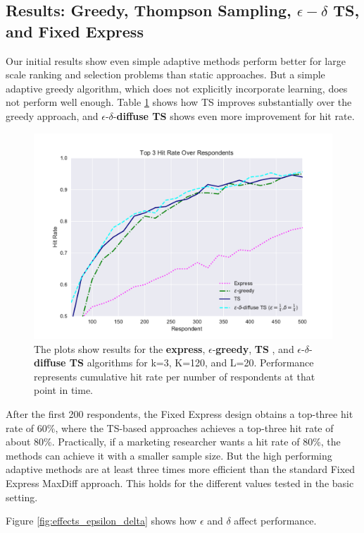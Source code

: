 \documentclass[a4paper,11pt]{article}
\newcommand{\fixedexpress}{\textbf{express}}
\newcommand{\egreedy}{$\epsilon$-\textbf{greedy}}
\newcommand{\ts}{\textbf{TS} }
\newcommand{\edts}{$\epsilon$-$\delta$-\textbf{diffuse TS} }
\begin{document}
\subsection{Results: Greedy, Thompson Sampling, $\epsilon-\delta$ TS, and Fixed Express}

Our initial results show even simple adaptive methods perform better for large scale ranking and selection problems than static approaches. But a simple adaptive greedy algorithm, which does not explicitly incorporate learning, does not perform well enough. Table \ref{fig:simple_result} shows how TS improves substantially over the greedy approach, and \edts shows even more improvement for hit rate.

\begin{figure}
\caption{The plots show results for the \fixedexpress, \egreedy, \ts, and \edts algorithms for k=3, K=120, and L=20. Performance represents cumulative hit rate per number of respondents at that point in time.}
\label{fig:simple_result}
\begin{center}
	\includegraphics[width=.8\textwidth]{plots/hr120v20k3.pdf}
\end{center}
\end{figure}

After the first 200 respondents, the Fixed Express design obtains a top-three hit rate of 60\%, where the TS-based approaches achieves a top-three hit rate of about 80\%. Practically, if a marketing researcher wants a hit rate of 80\%, the methods can achieve it with a smaller sample size. But the high performing adaptive methods are at least three times more efficient than the standard Fixed Express MaxDiff approach. This holds for the different values tested in the basic setting. 

Figure \ref{fig:effects_epsilon_delta} shows how $\epsilon$ and $\delta$ affect performance. 
\end{document}
